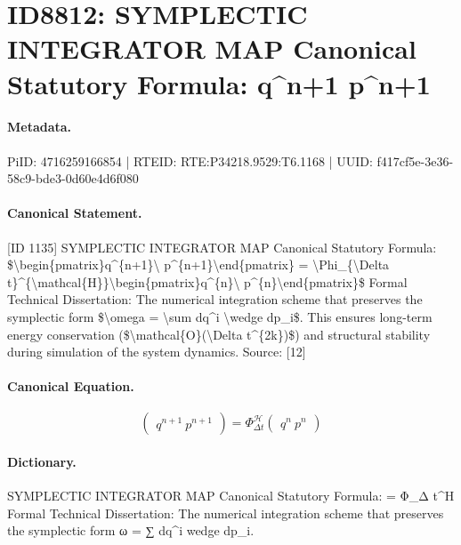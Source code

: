 \section*{ID8812: SYMPLECTIC INTEGRATOR MAP Canonical Statutory Formula: q\textasciicircum{}n+1 p\textasciicircum{}n+1}
\paragraph{Metadata.}
PiID: 4716259166854 | RTEID: RTE:P34218.9529:T6.1168 | UUID: f417cf5e-3e36-58c9-bde3-0d60e4d6f080

\paragraph{Canonical Statement.}
[ID 1135] SYMPLECTIC INTEGRATOR MAP Canonical Statutory Formula: \$\textbackslash{}begin\{pmatrix\}q\textasciicircum{}\{n+1\}\textbackslash{} p\textasciicircum{}\{n+1\}\textbackslash{}end\{pmatrix\} = \textbackslash{}Phi\_\{\textbackslash{}Delta t\}\textasciicircum{}\{\textbackslash{}mathcal\{H\}\}\textbackslash{}begin\{pmatrix\}q\textasciicircum{}\{n\}\textbackslash{} p\textasciicircum{}\{n\}\textbackslash{}end\{pmatrix\}\$ Formal Technical Dissertation: The numerical integration scheme that preserves the symplectic form \$\textbackslash{}omega = \textbackslash{}sum dq\textasciicircum{}i \textbackslash{}wedge dp\_i\$. This ensures long-term energy conservation (\$\textbackslash{}mathcal\{O\}(\textbackslash{}Delta t\textasciicircum{}\{2k\})\$) and structural stability during simulation of the system dynamics. Source: [12]

\paragraph{Canonical Equation.}
\[
\begin{pmatrix}q^{n+1}\ p^{n+1}\end{pmatrix} = \Phi_{\Delta t}^{\mathcal{H}}\begin{pmatrix}q^{n}\ p^{n}\end{pmatrix}
\]

\paragraph{Dictionary.}
SYMPLECTIC INTEGRATOR MAP Canonical Statutory Formula: = Φ\_Δ t\textasciicircum{}H Formal Technical Dissertation: The numerical integration scheme that preserves the symplectic form ω = ∑ dq\textasciicircum{}i wedge dp\_i.

